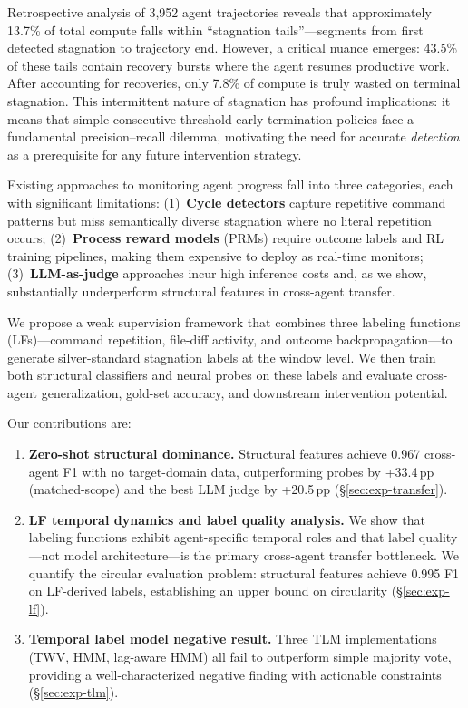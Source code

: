 \documentclass[11pt,a4paper]{article}
\begin{document}
Retrospective analysis of 3{,}952 agent trajectories reveals that approximately 13.7\% of total compute falls within ``stagnation tails''---segments from first detected stagnation to trajectory end.
However, a critical nuance emerges: 43.5\% of these tails contain recovery bursts where the agent resumes productive work.
After accounting for recoveries, only 7.8\% of compute is truly wasted on terminal stagnation.
This intermittent nature of stagnation has profound implications: it means that simple consecutive-threshold early termination policies face a fundamental precision--recall dilemma, motivating the need for accurate \emph{detection} as a prerequisite for any future intervention strategy.

Existing approaches to monitoring agent progress fall into three categories, each with significant limitations:
(1)~\textbf{Cycle detectors} capture repetitive command patterns but miss semantically diverse stagnation where no literal repetition occurs;
(2)~\textbf{Process reward models} (PRMs) require outcome labels and RL training pipelines, making them expensive to deploy as real-time monitors;
(3)~\textbf{LLM-as-judge} approaches incur high inference costs and, as we show, substantially underperform structural features in cross-agent transfer.

We propose a weak supervision framework that combines three labeling functions (LFs)---command repetition, file-diff activity, and outcome backpropagation---to generate silver-standard stagnation labels at the window level.
We then train both structural classifiers and neural probes on these labels and evaluate cross-agent generalization, gold-set accuracy, and downstream intervention potential.

Our contributions are:
\begin{enumerate}
\item \textbf{Zero-shot structural dominance.} Structural features achieve 0.967 cross-agent F1 with no target-domain data, outperforming probes by +33.4\,pp (matched-scope) and the best LLM judge by +20.5\,pp (\S\ref{sec:exp-transfer}).
\item \textbf{LF temporal dynamics and label quality analysis.} We show that labeling functions exhibit agent-specific temporal roles and that label quality---not model architecture---is the primary cross-agent transfer bottleneck. We quantify the circular evaluation problem: structural features achieve 0.995 F1 on LF-derived labels, establishing an upper bound on circularity (\S\ref{sec:exp-lf}).
\item \textbf{Temporal label model negative result.} Three TLM implementations (TWV, HMM, lag-aware HMM) all fail to outperform simple majority vote, providing a well-characterized negative finding with actionable constraints (\S\ref{sec:exp-tlm}).
\end{enumerate}
\end{document}
